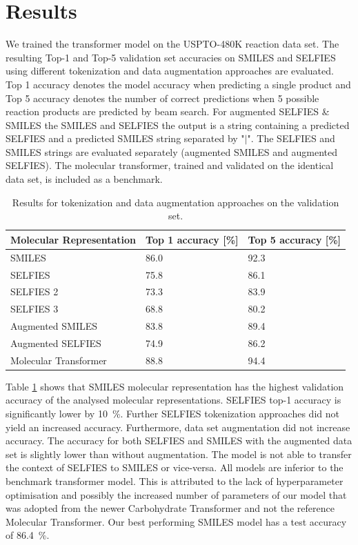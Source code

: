 \documentclass[10pt,conference,compsocconf]{IEEEtran}
\begin{document}
\section{Results}
We trained the transformer model on the USPTO-480K reaction data set. The resulting Top-1 and Top-5 validation set accuracies on SMILES and SELFIES using different tokenization and data augmentation approaches are evaluated. Top 1 accuracy denotes the model accuracy when predicting a single product and Top 5 accuracy denotes the number of correct predictions when 5 possible reaction products are predicted by beam search. For augmented SELFIES \& SMILES the SMILES and SELFIES the output is a string containing a predicted SELFIES and a predicted SMILES string separated by "$|$". The SELFIES and SMILES strings are evaluated separately (augmented SMILES and augmented SELFIES). The molecular transformer\cite{MolecularTransformer}, trained and validated on the identical data set, is included as a benchmark. \\
\begin{table}[h!]
  \centering
  \begin{tabular}[c]{|l|l|l|}
    \hline
    Molecular Representation & Top 1 accuracy [\%] & Top 5 accuracy [\%] \\
    \hline
    SMILES & 86.0 & 92.3 \\
    SELFIES & 75.8 & 86.1 \\
    SELFIES 2 & 73.3 &  83.9 \\
    SELFIES 3 & 68.8 & 80.2 \\
    Augmented SMILES & 83.8 & 89.4 \\
    Augmented SELFIES & 74.9 & 86.2\\ \hline
    Molecular Transformer \cite{MolecularTransformer} &  88.8 & 94.4 \\
    \hline
  \end{tabular}
  \caption{Results for tokenization and data augmentation approaches on the validation set.}
  \label{tab:firstresults}
\end{table}

Table \ref{tab:firstresults} shows that SMILES molecular representation has the highest validation accuracy of the analysed molecular representations. SELFIES top-1 accuracy is significantly lower by 10~\%. Further SELFIES tokenization approaches did not yield an increased accuracy. Furthermore, data set augmentation did not increase accuracy. The accuracy for both SELFIES and SMILES with the augmented data set is slightly lower than without augmentation. The model is not able to transfer the context of SELFIES to SMILES or vice-versa. All models are inferior to the benchmark transformer model. This is attributed to the lack of hyperparameter optimisation and possibly the increased number of parameters of our model that was adopted from the newer Carbohydrate Transformer and not the reference Molecular Transformer. Our best performing SMILES model has a test accuracy of 86.4~\%.\\
\end{document}
